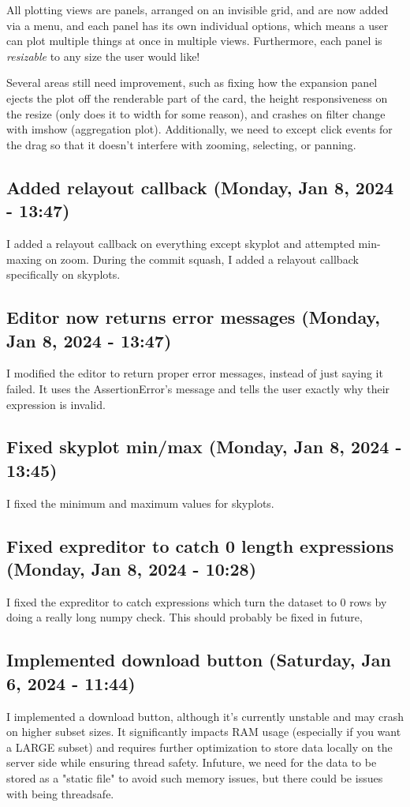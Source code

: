 \documentclass[a4paper]{article}
\begin{document}
All plotting views are panels, arranged on an invisible grid, and are now added via a menu, and each panel has its own individual options, which means a user can plot multiple things at once in multiple views. Furthermore, each panel is \emph{resizable} to any size the user would like!

Several areas still need improvement, such as fixing how the expansion panel ejects the plot off the renderable part of the card, the height responsiveness on the resize (only does it to width  for some reason), and crashes on filter change with imshow (aggregation plot). Additionally, we need to except click events for the drag so that it doesn't interfere with zooming, selecting, or panning.

\subsection*{Added relayout callback (Monday, Jan 8, 2024 - 13:47)}
I added a relayout callback on everything except skyplot and attempted min-maxing on zoom. During the commit squash, I added a relayout callback specifically on skyplots.

\subsection*{Editor now returns error messages (Monday, Jan 8, 2024 - 13:47)}
I modified the editor to return proper error messages, instead of just saying it failed. It uses the AssertionError's message and tells the user exactly why their expression is invalid.

\subsection*{Fixed skyplot min/max (Monday, Jan 8, 2024 - 13:45)}
I fixed the minimum and maximum values for skyplots.

\subsection*{Fixed expreditor to catch 0 length expressions (Monday, Jan 8, 2024 - 10:28)}
I fixed the expreditor to catch expressions which turn the dataset to 0 rows by doing a really long numpy check. This should probably be fixed in future,

\subsection*{Implemented download button (Saturday, Jan 6, 2024 - 11:44)}
I implemented a download button, although it's currently unstable and may crash on higher subset sizes. It significantly impacts RAM usage (especially if you want a LARGE subset) and requires further optimization to store data locally on the server side while ensuring thread safety. Infuture, we need for the data to be stored as a "static file" to avoid such memory issues, but there could be issues with being threadsafe.
\end{document}
